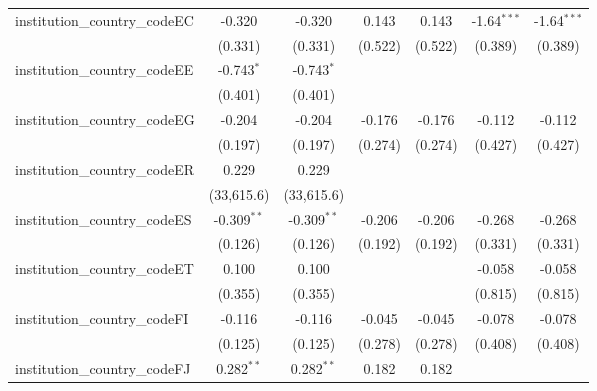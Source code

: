 \begin{tabular}{lcccccc}
   institution\_country\_codeEC          & -0.320         & -0.320         & 0.143          & 0.143          & -1.64$^{***}$  & -1.64$^{***}$\\   
                                         & (0.331)        & (0.331)        & (0.522)        & (0.522)        & (0.389)        & (0.389)\\   
   institution\_country\_codeEE          & -0.743$^{*}$   & -0.743$^{*}$   &                &                &                &   \\   
                                         & (0.401)        & (0.401)        &                &                &                &   \\   
   institution\_country\_codeEG          & -0.204         & -0.204         & -0.176         & -0.176         & -0.112         & -0.112\\   
                                         & (0.197)        & (0.197)        & (0.274)        & (0.274)        & (0.427)        & (0.427)\\   
   institution\_country\_codeER          & 0.229          & 0.229          &                &                &                &   \\   
                                         & (33,615.6)     & (33,615.6)     &                &                &                &   \\   
   institution\_country\_codeES          & -0.309$^{**}$  & -0.309$^{**}$  & -0.206         & -0.206         & -0.268         & -0.268\\   
                                         & (0.126)        & (0.126)        & (0.192)        & (0.192)        & (0.331)        & (0.331)\\   
   institution\_country\_codeET          & 0.100          & 0.100          &                &                & -0.058         & -0.058\\   
                                         & (0.355)        & (0.355)        &                &                & (0.815)        & (0.815)\\   
   institution\_country\_codeFI          & -0.116         & -0.116         & -0.045         & -0.045         & -0.078         & -0.078\\   
                                         & (0.125)        & (0.125)        & (0.278)        & (0.278)        & (0.408)        & (0.408)\\   
   institution\_country\_codeFJ          & 0.282$^{**}$   & 0.282$^{**}$   & 0.182          & 0.182          &                &   \\   

\end{tabular}
